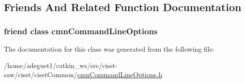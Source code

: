 \subsection{Friends And Related Function Documentation}
\hypertarget{classcmn_command_line_options_1_1_option_multiple_values_base_a18923f23ed3914806f1edf878a64b422}{
\subsubsection[{cmn\-Command\-Line\-Options}]{\setlength{\rightskip}{0pt plus 5cm}friend class {\bf cmn\-Command\-Line\-Options}\hspace{0.3cm}{\ttfamily [friend]}}}\label{classcmn_command_line_options_1_1_option_multiple_values_base_a18923f23ed3914806f1edf878a64b422}


The documentation for this class was generated from the following file\-:\begin{DoxyCompactItemize}
\item 
/home/adeguet1/catkin\-\_\-ws/src/cisst-\/saw/cisst/cisst\-Common/\hyperlink{cmn_command_line_options_8h}{cmn\-Command\-Line\-Options.\-h}\end{DoxyCompactItemize}
